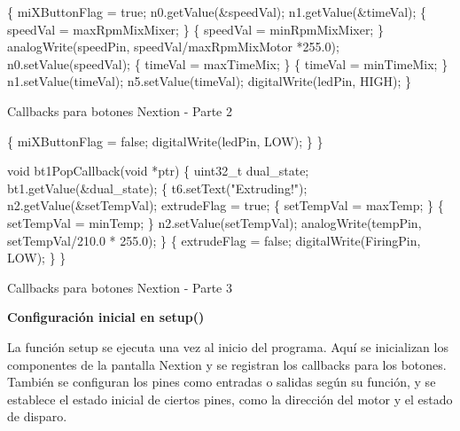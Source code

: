 \documentclass[14pt,oneside]{extarticle} %
\begin{document}
\begin{algorithm}[H]
\SetAlgoLined
    
     \{
        miXButtonFlag = true; \;
        n0.getValue(&speedVal); \;
        n1.getValue(&timeVal); \;
         \{
            speedVal = maxRpmMixMixer; \;
        \} \;
         \{
            speedVal = minRpmMixMixer; \;
        \} \;
        analogWrite(speedPin, speedVal/maxRpmMixMotor *255.0); \;
        n0.setValue(speedVal); \;
         \{
            timeVal = maxTimeMix; \;
        \} \;
         \{
            timeVal = minTimeMix; \;
        \} \;
        n1.setValue(timeVal); \;
        n5.setValue(timeVal); \;
        digitalWrite(ledPin, HIGH); \;
    \} \;

\caption{Callbacks para botones Nextion - Parte 2}
\label{al:CallbacksBotonesNextion}
\end{algorithm}

\begin{algorithm}[H]
\SetAlgoLined

    \Else \{
        miXButtonFlag = false; \;
        digitalWrite(ledPin, LOW); \;
    \} \;
\} \;

void bt1PopCallback(void *ptr) \{
    uint32_t dual\_state; \;
    bt1.getValue(&dual\_state); \;
     \{
        t6.setText("Extruding!"); \;
        n2.getValue(&setTempVal); \;
        extrudeFlag = true; \;
         \{
            setTempVal = maxTemp; \;
        \} \;
         \{
            setTempVal = minTemp; \;
        \} \;
        n2.setValue(setTempVal); \;
        analogWrite(tempPin, setTempVal/210.0 * 255.0); \;
    \} \;
    \Else \{
        extrudeFlag = false; \;
        digitalWrite(FiringPin, LOW); \;
    \} \;
\} \;

\caption{Callbacks para botones Nextion - Parte 3}
\label{al:CallbacksBotonesNextion}
\end{algorithm}

\textbf{Configuración inicial en setup()}

La función setup se ejecuta una vez al inicio del programa. Aquí se inicializan los componentes de la pantalla Nextion y se registran los callbacks para los botones. También se configuran los pines como entradas o salidas según su función, y se establece el estado inicial de ciertos pines, como la dirección del motor y el estado de disparo.
\end{document}
